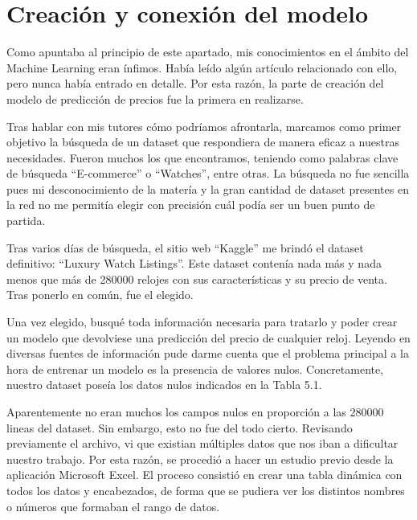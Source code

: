 \section{Creación y conexión del modelo}
	
	Como apuntaba al principio de este apartado, mis conocimientos en el ámbito del Machine Learning eran ínfimos. Había leído algún artículo relacionado con ello, pero nunca había entrado en detalle. Por esta razón, la parte de creación del modelo de predicción de precios fue la primera en realizarse. 
	
	Tras hablar con mis tutores cómo podríamos afrontarla, marcamos como primer objetivo la búsqueda de un dataset que respondiera de manera eficaz a nuestras necesidades. Fueron muchos los que encontramos, teniendo como palabras clave de búsqueda ``E-commerce'' o ``Watches'', entre otras. La búsqueda no fue sencilla pues mi desconocimiento de la matería y la gran cantidad de dataset presentes en la red no me permitía elegir con precisión cuál podía ser un buen punto de partida.
	
	Tras varios días de búsqueda, el sitio web ``Kaggle'' me brindó el dataset definitivo: ``Luxury Watch Listings''. Este dataset contenía nada más y nada menos que más de 280000 relojes con sus características y su precio de venta. Tras ponerlo en común, fue el elegido.
	
	Una vez elegido, busqué toda información necesaria para tratarlo y poder crear un modelo que devolviese una predicción del precio de cualquier reloj. Leyendo en diversas fuentes de información pude darme cuenta que el problema principal a la hora de entrenar un modelo es la presencia de valores nulos. Concretamente, nuestro dataset poseía los datos nulos indicados en la Tabla 5.1.
	

	Aparentemente no eran muchos los campos nulos en proporción a las 280000 lineas del dataset. Sin embargo, esto no fue del todo cierto. Revisando previamente el archivo, vi que existian múltiples datos que nos iban a dificultar nuestro trabajo. Por esta razón, se procedió a hacer un estudio previo desde la aplicación Microsoft Excel. El proceso consistió en crear una tabla dinámica con todos los datos y encabezados, de forma que se pudiera ver los distintos nombres o números que formaban el rango de datos. 
	
